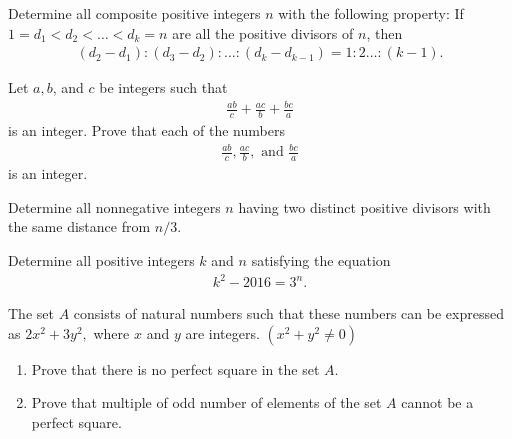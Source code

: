 \documentclass[problems.tex]{subfile}
\begin{document}
	
	
	
	\begin{problem}
		Determine all composite positive integers $n$ with the following property: If $1 = d_1 < d_2 <
		\dots < d_k = n$ are all the positive divisors of $n$, then
		\begin{align*}
			(d_2-d_1):(d_3-d_2):\dots : (d_k - d_{k-1}) = 1:2\dots :(k-1).
		\end{align*}
	\end{problem}
	
	
	
	\begin{problem}
		Let $a,b$, and $c$ be integers such that
		\begin{align*}
			\frac{ab}{c} + \frac{ac}{b} + \frac{bc}{a}
		\end{align*}
		is an integer. Prove that each of the numbers
		\begin{align*}
			\frac{ab}{c} , \frac{ac}{b}, \text{ and } \frac{bc}{a}
		\end{align*}
		is an integer.
	\end{problem}
	
	
	
	\begin{problem}
		Determine all nonnegative integers $n$ having two distinct positive divisors with the same distance from $n/3$.
	\end{problem}
	
	
	\begin{problem}
		Determine all positive integers $k$ and $n$ satisfying the equation
		\begin{align*}
			k^2 - 2016 = 3^n.
		\end{align*}
	\end{problem}
	
	
	
	
	\begin{problem}
		The set $A$ consists of natural numbers such that these numbers can be expressed as $2x^2+3y^2,$ where $x$ and $y$ are integers. $(x^2+y^2\not=0)$
		\begin{enumerate}
			\item Prove that there is no perfect square in the set $A.$
			\item Prove that multiple of odd number of elements of the set $A$ cannot be a perfect square.
		\end{enumerate}
	\end{problem}
	
\end{document}

